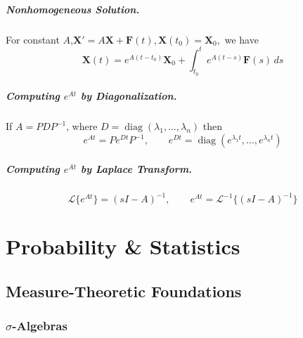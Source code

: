 \documentclass[oneside]{book}
\begin{document}
\paragraph{Nonhomogeneous Solution.}
For constant $A$,$
    \mathbf{X}'=A\mathbf{X}+\mathbf{F}(t),
    \mathbf{X}(t_0)=\mathbf{X}_0,
$
we have
\[
    \mathbf{X}(t)
    =
    e^{A(t-t_0)}\mathbf{X}_0
    +
    \int_{t_0}^{t}e^{A(t-s)}\mathbf{F}(s)\,ds
\]

\paragraph{Computing $e^{At}$ by Diagonalization.}
If $A=PDP^{-1}$, where $ D=\operatorname{diag}(\lambda_1,\ldots,\lambda_n)$ then
\[
    e^{At}=Pe^{Dt}P^{-1},
    \qquad
    e^{Dt}=\operatorname{diag}(e^{\lambda_1t},\ldots,e^{\lambda_nt})
\]

\paragraph{Computing $e^{At}$ by Laplace Transform.}

\[
    \mathcal{L}\{e^{At}\}=(sI-A)^{-1},
    \qquad
    e^{At}=\mathcal{L}^{-1}\{(sI-A)^{-1}\}
\]

% 

\chapter{Probability \& Statistics}
\label{ch:prob}

\section{Measure-Theoretic Foundations}

\subsection*{$\sigma$-Algebras}

\end{document}
